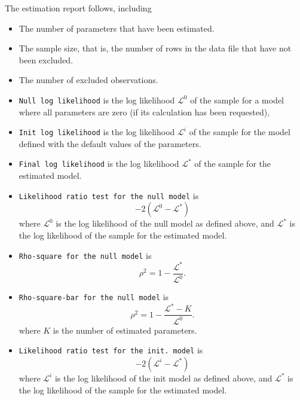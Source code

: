 \documentclass[12pt,a4paper]{article}
\begin{document}
The estimation report follows, including
   \begin{itemize}
      \item The number of parameters that have been estimated.
      \item The sample size, that is, the number of rows in
        the data file  that have not been excluded.
      \item The number of excluded observations.
      \item \texttt{Null log likelihood} is the log likelihood
        $\mathcal{L}^0$ of
        the sample for a model where all parameters are zero (if its calculation has been requested),
      \item \texttt{Init log likelihood} is the log likelihood
        $\mathcal{L}^i$ of
        the sample for the model defined with the default values of
        the parameters. 
      \item \texttt{Final log likelihood} is the log likelihood
        $\mathcal{L}^*$ of the sample for the estimated model. 
      \item \texttt{Likelihood ratio test for the null model} is 
         \begin{equation}
            -2 ( \mathcal{L}^0 - \mathcal{L}^*)
         \end{equation}
         where 
         $ \mathcal{L}^0$ is the log likelihood of the null model
         as defined above, and $\mathcal{L}^*$ is the log likelihood of the sample for the estimated model. 
      \item \texttt{Rho-square for the null model} is
         \begin{equation}
            \rho^2 = 1 - \frac{\mathcal{L}^*}{\mathcal{L}^0}.
         \end{equation}
        \item \texttt{Rho-square-bar for the null model} is
         \begin{equation}
            \rho^2 = 1 - \frac{\mathcal{L}^* - K}{\mathcal{L}^0}.
         \end{equation}
         where $K$ is the number of estimated parameters.
      \item \texttt{Likelihood ratio test for the init. model} is 
         \begin{equation}
            -2 ( \mathcal{L}^i - \mathcal{L}^*)
         \end{equation}
         where 
         $ \mathcal{L}^i$ is the log likelihood of the init model
         as defined above, and $\mathcal{L}^*$ is the log likelihood of the sample for the estimated model. 

\end{itemize}
\end{document}
